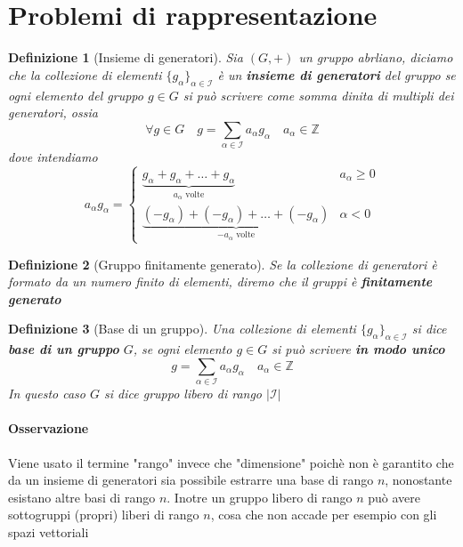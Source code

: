 \documentclass[a4paper]{report}
\newtheorem{definition}{Definizione}
\newcommand{\Z}{\ensuremath{\mathbb{Z}}}
\begin{document}
\section{Problemi di rappresentazione}
\begin{definition}[Insieme di generatori]
    Sia $(G,+)$ un gruppo abrliano, diciamo che la collezione di elementi $\{g_\alpha\}_{\alpha\in\mathcal{I}}$ è un \textbf{insieme di generatori} del gruppo se ogni elemento del gruppo $g\in G$ si può scrivere come somma dinita di multipli dei generatori, ossia
    \[
        \forall g\in G\quad g=\sum_{\alpha\in\mathcal{I}}a_\alpha g_\alpha\quad a_\alpha\in\Z
    \]
    dove intendiamo
    \[
        a_\alpha g_\alpha=\begin{cases}
            \underbrace{g_\alpha+g_\alpha+\dots+g_\alpha}_{a_\alpha\text{ volte}}           & a_\alpha\geq 0 \\
            \underbrace{(-g_\alpha)+(-g_\alpha)+\dots+(-g_\alpha)}_{-a_\alpha\text{ volte}} & \alpha<0
        \end{cases}
    \]
\end{definition}
\begin{definition}[Gruppo finitamente generato]
    Se la collezione di generatori è formato da un numero finito di elementi, diremo che il gruppi è \textbf{finitamente generato}
\end{definition}
\begin{definition}[Base di un gruppo]
    Una collezione di elementi $\{g_\alpha\}_{\alpha\in\mathcal{I}}$ si dice \textbf{base di un gruppo} $G$, se ogni elemento $g\in G$ si può scrivere \textbf{in modo unico}
    \[
        g=\sum_{\alpha\in\mathcal{I}}a_\alpha g_\alpha\quad a_\alpha\in\Z
    \]
    In questo caso $G$ si dice gruppo libero di rango $|\mathcal{I}|$
\end{definition}
\paragraph{Osservazione} Viene usato il termine "rango" invece che "dimensione" poichè non è garantito che da un insieme di generatori sia possibile estrarre una base di rango $n$, nonostante esistano altre basi di rango $n$. Inotre un gruppo libero di rango $n$ può avere sottogruppi (propri) liberi di rango $n$, cosa che non accade per esempio con gli spazi vettoriali
\pagebreak
\end{document}
